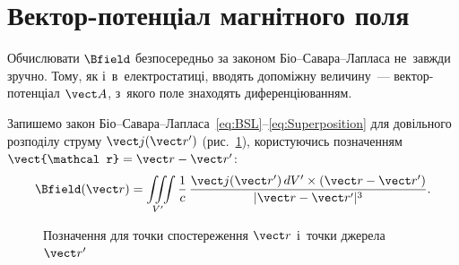 \section{Вектор-потенціал магнітного поля}\hypertarget{magnetic-vector-potential}{}

Обчислювати $\Bfield$ безпосередньо за законом Біо--Савара--Лапласа не~завжди зручно.
Тому, як і~в~електростатиці, вводять допоміжну величину~--- вектор-потенціал $\vect A$,
з~якого поле знаходять диференціюванням.

Запишемо закон Біо--Савара--Лапласа~\eqref{eq:BSL}--\eqref{eq:Superposition} для довільного
розподілу струму $\vect j(\vect r')$ (рис.~\ref{pic:FieldPoint}), користуючись позначенням
$\vect{\mathcal r} = \vect r - \vect r'$:
\begin{equation*}
	\Bfield(\vect r) = \iiint\limits_{V'} \frac1c\, \frac{\vect j(\vect r')\, dV' \times(\vect r-\vect r')}{|\vect r - \vect r'|^3}.
\end{equation*}

\begin{figure}\centering
	\caption{Позначення для точки спостереження $\vect r$ і~точки джерела $\vect
			r'$\label{pic:FieldPoint}}
\end{figure}

